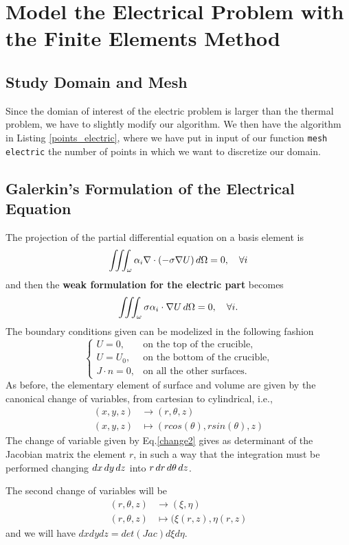 \section{Model the Electrical Problem with the Finite Elements Method}
\subsection{Study Domain and Mesh}
Since the domian of interest of the electric problem is larger than the thermal problem, we have to slightly modify our algorithm. We then have the algorithm in Listing \ref{points_electric}, where we have put in input of our function \texttt{mesh electric} the number of points in which we want to discretize our domain.
   




\subsection{Galerkin’s Formulation of the Electrical Equation}
The projection of the partial differential equation on a basis element is
\[\iiint_{\omega} \alpha_i \nabla\cdot(-\sigma\nabla U)\mathop{}\!d\Omega=0, \quad \forall i \]
and then the \textbf{weak formulation for the electric part} becomes
\begin{equation}
\iiint_{\omega}\sigma\alpha_i\cdot\nabla U\mathop{}\!d \Omega=0,\quad \forall i.
\end{equation}
The boundary conditions given can be modelized in the following fashion
\[\begin{cases}
	U = 0, &\text{on the top of the crucible,}\\
	U = U_0, &\text{on the bottom of the crucible,}\\
	J\cdot n=0, &\text{on all the other surfaces.}
\end{cases} \]
As before, the elementary element of surface and volume are given by the canonical change of variables, from cartesian to cylindrical, i.e., \begin{align}\label{change2}
(x,y,z)&\to(r,\theta,z)\\
(x,y,z)&\mapsto(rcos(\theta),rsin(\theta),z)\nonumber
\end{align}
The change of variable given by Eq.\ref{change2} gives as determinant of the Jacobian matrix the element $ r $, in such a way that the integration must be performed changing $ \mathop{}\!d x\mathop{}\!d y\mathop{}\!d z $ into $ r\mathop{}\!d r\mathop{}\!d\theta\mathop{}\!d z $.

The second change of variables will be 
\begin{align}\label{change3}
(r,\theta,z)&\to(\xi,\eta)\\
(r,\theta,z)&\mapsto(\xi(r,z),\eta(r,z)\nonumber
\end{align}
and we will have $ dxdydz=det(Jac)d\xi d\eta $.

